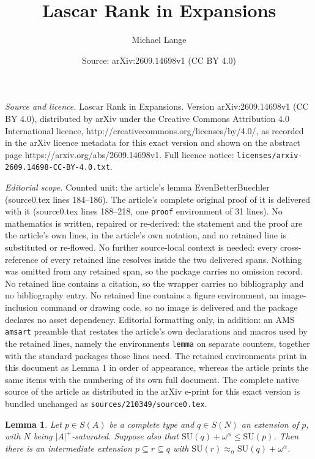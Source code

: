 \documentclass[10pt,a4paper]{amsart}
\title{Lascar Rank in Expansions}
\author{Michael Lange}
\date{Source: arXiv:2609.14698v1 (CC BY 4.0)}
\newtheorem{lemma}{Lemma}
\begin{document}
\maketitle

\noindent\emph{Source and licence.} Lascar Rank in Expansions. Version arXiv:2609.14698v1 (CC BY 4.0), distributed by arXiv under the Creative Commons Attribution 4.0 International licence, http://creativecommons.org/licenses/by/4.0/, as recorded in the arXiv licence metadata for this exact version and shown on the abstract page https://arxiv.org/abs/2609.14698v1. Full licence notice: \texttt{licenses/arxiv-2609.14698-CC-BY-4.0.txt}.\par\smallskip

\noindent\textit{Editorial scope.} Counted unit: the article's lemma EvenBetterBuechler (source0.tex lines 184--186). The article's complete original proof of it is delivered with it (source0.tex lines 188--218, one \texttt{proof} environment of 31 lines). No mathematics is written, repaired or re-derived: the statement and the proof are the article's own lines, in the article's own notation, and no retained line is substituted or re-flowed.  No further source-local context is needed: every cross-reference of every retained line resolves inside the two delivered spans.  Nothing was omitted from any retained span, so the package carries no omission record.  No retained line contains a citation, so the wrapper carries no bibliography and no bibliography entry.  No retained line contains a figure environment, an image-inclusion command or drawing code, so no image is delivered and the package declares no asset dependency.  Editorial formatting only, in addition: an AMS \texttt{amsart} preamble that restates the article's own declarations and macros used by the retained lines, namely the environments \texttt{lemma} on separate counters, together with the standard packages those lines need.  The retained environments print in this document as Lemma 1 in order of appearance, whereas the article prints the same items with the numbering of its own full document.  The complete native source of the article as distributed in the arXiv e-print for this exact version is bundled unchanged as \texttt{sources/210349/source0.tex}.
\begin{lemma}\label{EvenBetterBuechler}
    Let $p\in S(A)$ be a complete type and $q\in S(N)$ an extension of $p$, with $N$ being $|A|^+$-saturated. Suppose also that $\mathrm{SU}(q)+\omega^\alpha\leq\mathrm{SU}(p)$. Then there is an intermediate extension $p\subseteq r\subseteq q$ with $\mathrm{SU}(r)\approx_\alpha \mathrm{SU}(q)+\omega^\alpha$. %
\end{lemma}
\end{document}
